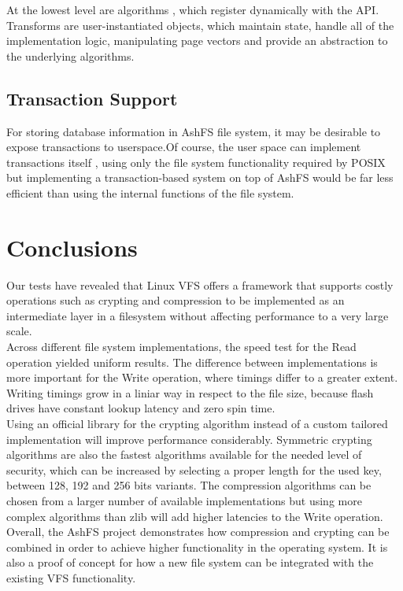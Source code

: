 \documentclass[conference]{IEEEtran}
\begin{document}
At the lowest level are algorithms , which register dynamically with the API. Transforms are user-instantiated 
objects, which maintain state, handle all of the implementation logic, manipulating page vectors and 
provide an abstraction to the underlying algorithms.

\subsection{Transaction Support}
For storing database information in AshFS file system, it may be desirable to expose transactions 
to userspace.Of course, the user space can implement transactions itself , using only the file system 
functionality required by POSIX but implementing a transaction-based system on top of AshFS would 
be far less efficient than using the internal functions of the file system.

\section{Conclusions}
Our tests have revealed that Linux VFS offers a framework that supports costly operations such as
crypting and compression to be implemented as an intermediate layer in a filesystem without
affecting performance to a very large scale.\\

Across different file system implementations, the speed test for the Read operation yielded uniform results.
The difference between implementations is more important for the Write operation, where timings differ to a greater
extent. Writing timings grow in a liniar way in respect to the file size, because flash drives have constant lookup
latency and zero spin time.\\ 

Using an official library for the crypting algorithm instead of a custom tailored implementation will
improve performance considerably. Symmetric crypting algorithms are also the fastest algorithms available for the
needed level of security, which can be increased by selecting a proper length for the used key, between 128, 192 and 256
bits variants. The compression algorithms can be chosen from a larger number of available implementations but using more
complex algorithms than zlib will add higher latencies to the Write operation.\\

Overall, the AshFS project demonstrates how compression and crypting can be combined in order to achieve higher
functionality in the operating system. It is also a proof of concept for how a new file system can be integrated with
the existing VFS functionality.
\end{document}
